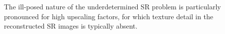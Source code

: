 \documentclass[10pt,twocolumn,letterpaper]{article}
\begin{document}
	The ill-posed nature of the underdetermined \ac{SR} problem is particularly pronounced for high upscaling factors, for which texture detail in the reconstructed \ac{SR} images is typically absent.
%
\end{document}
